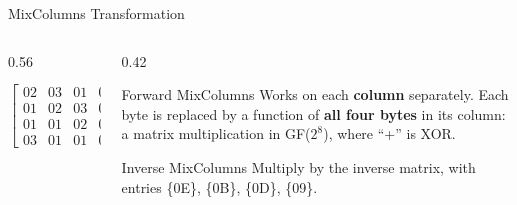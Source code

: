 \documentclass[aspectratio=169,11pt,xcolor={table}]{beamer}
\begin{document}
\begin{frame}{MixColumns Transformation}
  \begin{columns}[c]
    \begin{column}{0.56\textwidth}
      \centering
      $\begin{bmatrix} 02 & 03 & 01 & 01\\ 01 & 02 & 03 & 01\\ 01 & 01 & 02 & 03\\ 03 & 01 & 01 & 02 \end{bmatrix}
      \begin{bmatrix} s_{0j}\\ s_{1j}\\ s_{2j}\\ s_{3j} \end{bmatrix} =
      \begin{bmatrix} s'_{0j}\\ s'_{1j}\\ s'_{2j}\\ s'_{3j} \end{bmatrix}$\\[4mm]
    \end{column}
    \begin{column}{0.42\textwidth}
      \begin{block}{Forward MixColumns}
        \small Works on each \textbf{column} separately. Each byte is replaced by a function of \textbf{all four bytes} in its column: a matrix multiplication in GF($2^8$), where ``+'' is XOR.
      \end{block}
      \begin{block}{Inverse MixColumns}
        \small Multiply by the inverse matrix, with entries \{0E\}, \{0B\}, \{0D\}, \{09\}.
      \end{block}
    \end{column}
  \end{columns}
\end{frame}
\end{document}
